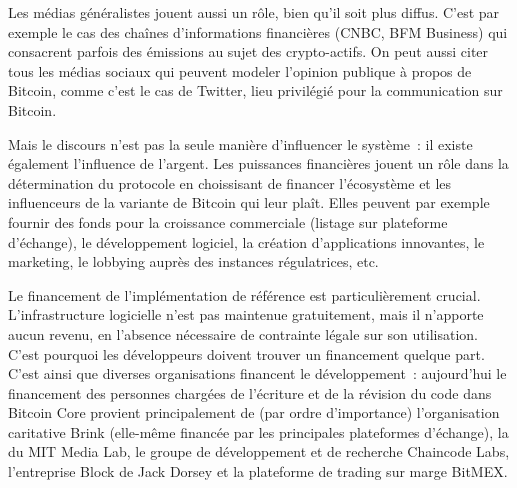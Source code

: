 Les médias généralistes jouent aussi un rôle, bien qu'il soit plus diffus. C'est par exemple le cas des chaînes d'informations financières (CNBC, BFM Business) qui consacrent parfois des émissions au sujet des crypto-actifs. On peut aussi citer tous les médias sociaux qui peuvent modeler l'opinion publique à propos de Bitcoin, comme c'est le cas de Twitter, lieu privilégié pour la communication sur Bitcoin.


Mais le discours n'est pas la seule manière d'influencer le système~: il existe également l'influence de l'argent. Les puissances financières jouent un rôle dans la détermination du protocole en choissisant de financer l'écosystème et les influenceurs de la variante de Bitcoin qui leur plaît. Elles peuvent par exemple fournir des fonds pour la croissance commerciale (listage sur plateforme d'échange), le développement logiciel, la création d'applications innovantes, le marketing, le lobbying auprès des instances régulatrices, etc.

Le financement de l'implémentation de référence est particulièrement crucial. L'infrastructure logicielle n'est pas maintenue gratuitement, mais il n'apporte aucun revenu, en l'absence nécessaire de contrainte légale sur son utilisation. C'est pourquoi les développeurs doivent trouver un financement quelque part. C'est ainsi que diverses organisations financent le développement~: aujourd'hui le financement des personnes chargées de l'écriture et de la révision du code dans Bitcoin Core provient principalement de (par ordre d'importance) l'organisation caritative Brink (elle-même financée par les principales plateformes d'échange), la  du MIT Media Lab, le groupe de développement et de recherche Chaincode Labs, l'entreprise Block de Jack Dorsey et la plateforme de trading sur marge BitMEX.

